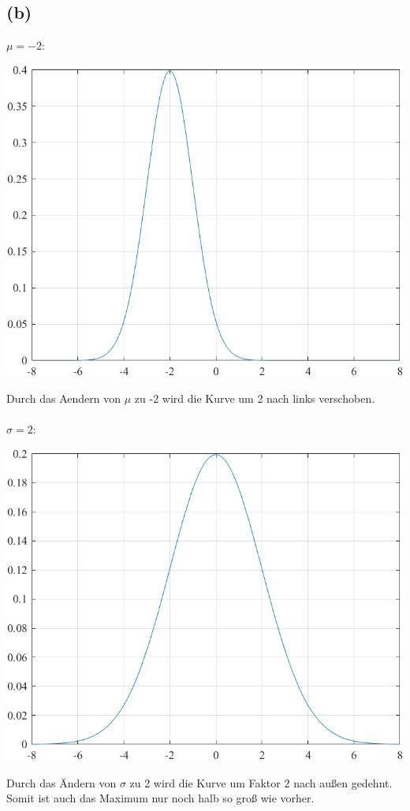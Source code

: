 \documentclass[a4paper]{scrartcl}
\begin{document}
\subsection*{(b)}
$\mu = -2:$
\begin{center}
	\includegraphics*[scale = 0.5]{question2b1.png}
\end{center}
Durch das Aendern von $\mu$ zu -2 wird die Kurve um 2 nach links verschoben.\\ \ \\
$\sigma = 2:$
\begin{center}
	\includegraphics*[scale = 0.5]{question2b2.png}
\end{center}
Durch das Ändern von $\sigma$ zu 2 wird die Kurve um Faktor 2 nach außen gedehnt. Somit ist auch das Maximum nur noch halb so groß wie vorher.\\
\end{document}
